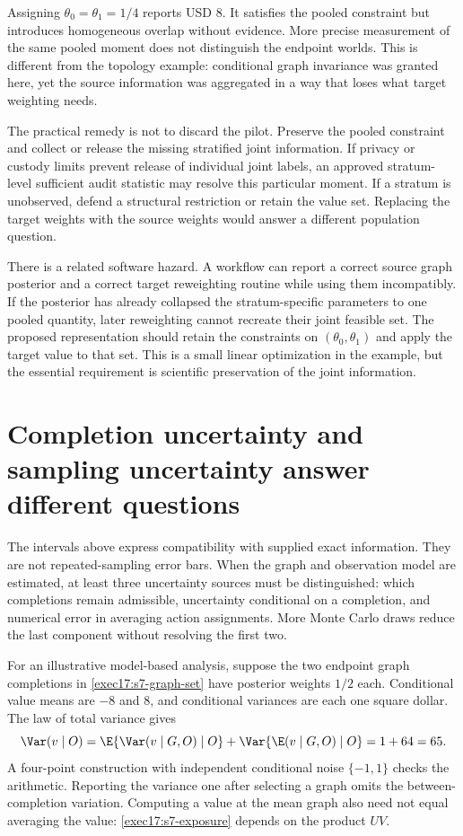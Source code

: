 Assigning $\theta_0=\theta_1=1/4$ reports USD 8. It satisfies the pooled
constraint but introduces homogeneous overlap without evidence. More precise
measurement of the same pooled moment does not distinguish the endpoint
worlds. This is different from the topology example: conditional graph
invariance was granted here, yet the source information was aggregated in a
way that loses what target weighting needs.

The practical remedy is not to discard the pilot. Preserve the pooled
constraint and collect or release the missing stratified joint information.
If privacy or custody limits prevent release of individual joint labels, an
approved stratum-level sufficient audit statistic may resolve this particular
moment. If a stratum is unobserved, defend a structural restriction or retain
the value set. Replacing the target weights with the source weights would
answer a different population question.

There is a related software hazard. A workflow can report a correct source
graph posterior and a correct target reweighting routine while using them
incompatibly. If the posterior has already collapsed the stratum-specific
parameters to one pooled quantity, later reweighting cannot recreate their
joint feasible set. The proposed representation should retain the constraints
on $(\theta_0,\theta_1)$ and apply the target value to that set. This is a
small linear optimization in the example, but the essential requirement is
scientific preservation of the joint information.

\section{Completion uncertainty and sampling uncertainty answer different questions}
\label{exec17:s7-uncertainty}

The intervals above express compatibility with supplied exact information.
They are not repeated-sampling error bars. When the graph and observation
model are estimated, at least three uncertainty sources must be distinguished:
which completions remain admissible, uncertainty conditional on a completion,
and numerical error in averaging action assignments. More Monte Carlo draws
reduce the last component without resolving the first two.

For an illustrative model-based analysis, suppose the two endpoint graph
completions in \eqref{exec17:s7-graph-set} have posterior weights $1/2$ each.
Conditional value means are $-8$ and $8$, and conditional variances are each
one square dollar. The law of total variance gives
\begin{equation}
 \Var(v\mid O)=
 \E\{\Var(v\mid G,O)\mid O\}
 +\Var\{\E(v\mid G,O)\mid O\}=1+64=65.
 \label{exec17:s7-total-variance}
\end{equation}
A four-point construction with independent conditional noise $\{-1,1\}$
checks the arithmetic. Reporting the variance one after selecting a graph
omits the between-completion variation. Computing a value at the mean graph
also need not equal averaging the value: \eqref{exec17:s7-exposure} depends
on the product $UV$.~\citep{exec17_s7_math}

